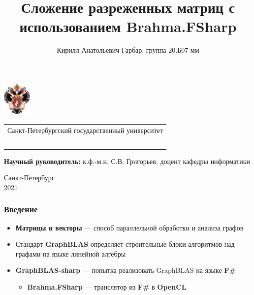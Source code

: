 \documentclass[aspectratio=169]{beamer}
\title[GraphBLAS F\#]{Сложение разреженных матриц с использованием Brahma.FSharp}
\institute[СПбГУ]{}
\author[Кирилл Гарбар]{Кирилл Анатольевич Гарбар, группа 20.Б07-мм}
\begin{document}
{
\begin{frame}
  \includegraphics[width=1.4cm]{pictures/SPbGU_Logo.png}
\vspace{-25pt}
\hspace{-10pt}
\begin{center}
   \begin{tabular}{c}
        \scriptsize{Санкт-Петербургский государственный университет} \\
        \ 
    \end{tabular}
\titlepage
\end{center}

\btVFill

{\scriptsize
   {\bfseries Научный руководитель:} к.ф.-м.н. С.В. Григорьев, доцент кафедры информатики \\  
}
\begin{center}
  \vspace{5pt}
  \scriptsize{Санкт-Петербург\\
                 2021}
  \end{center}

\end{frame}
}

\begin{frame}[fragile]  
  \frametitle{Введение}
  \begin{itemize}
    \item \textbf{Матрицы и векторы} --- способ параллельной обработки и анализа графов
    \item Стандарт \textbf{GraphBLAS} определяет строительные блоки алгоритмов над графами на языке линейной алгебры
    \item \textbf{GraphBLAS-sharp} --- попытка реализовать GraphBLAS на языке \textbf{F\#}
    \begin{itemize}
        \item \textbf{Brahma.FSharp} --- транслятор из \textbf{F\#} в \textbf{OpenCL}
    \end{itemize}
  \end{itemize}
\end{frame}
\end{document}
